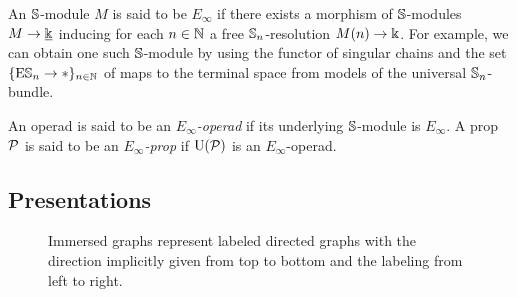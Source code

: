 An $\mathbb{S}$-module $M$ is said to be $E_\infty$ if there exists a morphism of $\mathbb{S}$-modules $M \to \underline{\Bbbk}$ inducing for each $n \in \mathbb{N}$ a free $\mathbb{S}_n$-resolution $M(n) \to \Bbbk$.
For example, we can obtain one such $\mathbb{S}$-module by using the functor of singular chains and the set $\{\mathrm{E} \mathbb{S}_n \to \ast\}_{n \in \mathbb{N}}$ of maps to the terminal space from models of the universal $\mathbb{S}_n$-bundle.

An operad is said to be an \textit{$E_\infty$-operad} if its underlying $\mathbb{S}$-module is $E_\infty$.
A prop $\mathcal{P}$ is said to be an \textit{$E_\infty$-prop} if $\operatorname{U}(\mathcal{P})$ is an $E_\infty$-operad.

\subsection{Presentations} \label{ss:presentation}

\begin{figure}
	\centering
	
	\caption{Immersed graphs represent labeled directed graphs with the direction implicitly given from top to bottom and the labeling from left to right.}
	\label{f:immersion}
\end{figure}


